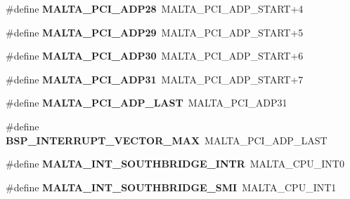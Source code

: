 \begin{DoxyCompactItemize}
\item 
\mbox{\label{group__bsp__interrupt_ga51b43a0f2167525d874568f9ebdea1a1}} 
\#define {\bfseries M\+A\+L\+T\+A\+\_\+\+P\+C\+I\+\_\+\+A\+D\+P28}~M\+A\+L\+T\+A\+\_\+\+P\+C\+I\+\_\+\+A\+D\+P\+\_\+\+S\+T\+A\+RT+4
\item 
\mbox{\label{group__bsp__interrupt_ga8c538cf6b8789e11f29dcb15a88df3b4}} 
\#define {\bfseries M\+A\+L\+T\+A\+\_\+\+P\+C\+I\+\_\+\+A\+D\+P29}~M\+A\+L\+T\+A\+\_\+\+P\+C\+I\+\_\+\+A\+D\+P\+\_\+\+S\+T\+A\+RT+5
\item 
\mbox{\label{group__bsp__interrupt_gad8aec1dbc4488c39ba68a22942109ea9}} 
\#define {\bfseries M\+A\+L\+T\+A\+\_\+\+P\+C\+I\+\_\+\+A\+D\+P30}~M\+A\+L\+T\+A\+\_\+\+P\+C\+I\+\_\+\+A\+D\+P\+\_\+\+S\+T\+A\+RT+6
\item 
\mbox{\label{group__bsp__interrupt_ga71d7cc746951f88c6e513ed453293268}} 
\#define {\bfseries M\+A\+L\+T\+A\+\_\+\+P\+C\+I\+\_\+\+A\+D\+P31}~M\+A\+L\+T\+A\+\_\+\+P\+C\+I\+\_\+\+A\+D\+P\+\_\+\+S\+T\+A\+RT+7
\item 
\mbox{\label{group__bsp__interrupt_ga14309732fc352ca8fdaa3a473e21a125}} 
\#define {\bfseries M\+A\+L\+T\+A\+\_\+\+P\+C\+I\+\_\+\+A\+D\+P\+\_\+\+L\+A\+ST}~M\+A\+L\+T\+A\+\_\+\+P\+C\+I\+\_\+\+A\+D\+P31
\item 
\mbox{\label{group__bsp__interrupt_gae4a2cdda5816a4c83c2fac0a49880c6e}} 
\#define {\bfseries B\+S\+P\+\_\+\+I\+N\+T\+E\+R\+R\+U\+P\+T\+\_\+\+V\+E\+C\+T\+O\+R\+\_\+\+M\+AX}~M\+A\+L\+T\+A\+\_\+\+P\+C\+I\+\_\+\+A\+D\+P\+\_\+\+L\+A\+ST
\item 
\mbox{\label{group__bsp__interrupt_ga8f9a6f78d8dfa2b8eff0ba6253409142}} 
\#define {\bfseries M\+A\+L\+T\+A\+\_\+\+I\+N\+T\+\_\+\+S\+O\+U\+T\+H\+B\+R\+I\+D\+G\+E\+\_\+\+I\+N\+TR}~M\+A\+L\+T\+A\+\_\+\+C\+P\+U\+\_\+\+I\+N\+T0
\item 
\mbox{\label{group__bsp__interrupt_ga7489b8ac7c03885156c0cb57476b13e0}} 
\#define {\bfseries M\+A\+L\+T\+A\+\_\+\+I\+N\+T\+\_\+\+S\+O\+U\+T\+H\+B\+R\+I\+D\+G\+E\+\_\+\+S\+MI}~M\+A\+L\+T\+A\+\_\+\+C\+P\+U\+\_\+\+I\+N\+T1

\end{DoxyCompactItemize}
